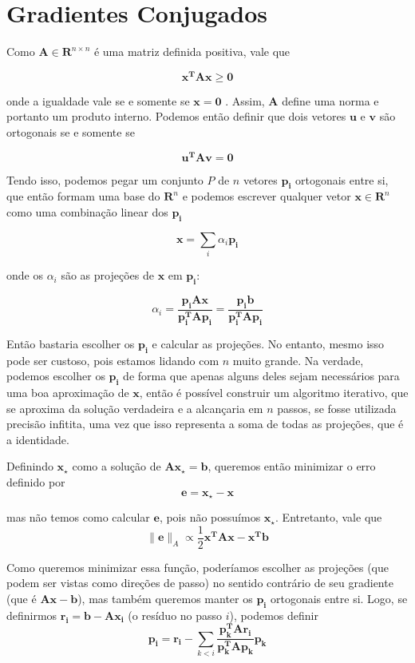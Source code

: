 \documentclass[a4paper,11pt]{article}
\begin{document}
    \section*{Gradientes Conjugados}
    Como $\mathbf{A} \in \mathbf{R}^{n\times n}$ é uma matriz definida positiva, vale que

    $$ \mathbf{x^{T}Ax} \geq \mathbf{0} $$

    onde a igualdade vale se e somente se $\mathbf{x} = \mathbf{0}$ .
    Assim, $\mathbf{A}$ define uma norma e portanto um produto interno.
    Podemos então definir que dois vetores $\mathbf{u}$ e $\mathbf{v}$ são ortogonais se e somente se

    $$ \mathbf{u^{T}Av} = \mathbf{0}$$

    Tendo isso, podemos pegar um conjunto $P$ de $n$ vetores $\mathbf{p_i}$ ortogonais entre si, que então formam uma base do $\mathbf{R}^n$ e podemos escrever qualquer vetor $ \mathbf{x} \in \mathbf{R}^n$ como uma combinação linear dos $\mathbf{p_i}$

    $$ \mathbf{x} = \sum_i \alpha_i \mathbf{p_i} $$

    onde os $\alpha_i$ são as projeções de $\mathbf{x}$ em $\mathbf{p_i}$:

    $$ \alpha_i = \frac{\mathbf{p_i Ax}}{\mathbf{p_i^TAp_i}} = \frac{\mathbf{p_i b}}{\mathbf{p_i^TAp_i}} $$

    Então bastaria escolher os $\mathbf{p_i}$ e calcular as projeções. No entanto, mesmo isso pode ser custoso, pois estamos lidando com $n$ muito grande.
    Na verdade, podemos escolher os $\mathbf{p_i}$ de forma que apenas alguns deles sejam necessários para uma boa aproximação de $\mathbf{x}$, então é possível construir um algoritmo iterativo, que se aproxima da solução verdadeira e a alcançaria em $n$ passos, se fosse utilizada precisão infitita, uma vez que isso representa a soma de todas as projeções, que é a identidade.

    Definindo $\mathbf{x_\star}$ como a solução de $\mathbf{Ax_\star} = \mathbf{b}$, queremos então minimizar o erro definido por
    $$ \mathbf{e} = \mathbf{x_\star} - \mathbf{x}$$

    mas não temos como calcular $\mathbf{e}$, pois não possuímos $\mathbf{x_\star}$. Entretanto, vale que
    $$ \| \mathbf{e} \|_A \propto \frac{1}{2}\mathbf{x^TAx - x^Tb} $$

    Como queremos minimizar essa função, poderíamos escolher as projeções (que podem ser vistas como direções de passo) no sentido contrário de seu gradiente (que é $\mathbf{Ax - b}$), mas também queremos manter os $\mathbf{p_i}$ ortogonais entre si. Logo, se definirmos $\mathbf{r_i} = \mathbf{b - Ax_i}$ (o resíduo no passo $i$), podemos definir
    $$ \mathbf{p_i} = \mathbf{r_i} - \sum_{k<i} \mathbf{\frac{p_k^T A r_i}{p_k^T A p_k} p_k}$$
\end{document}

